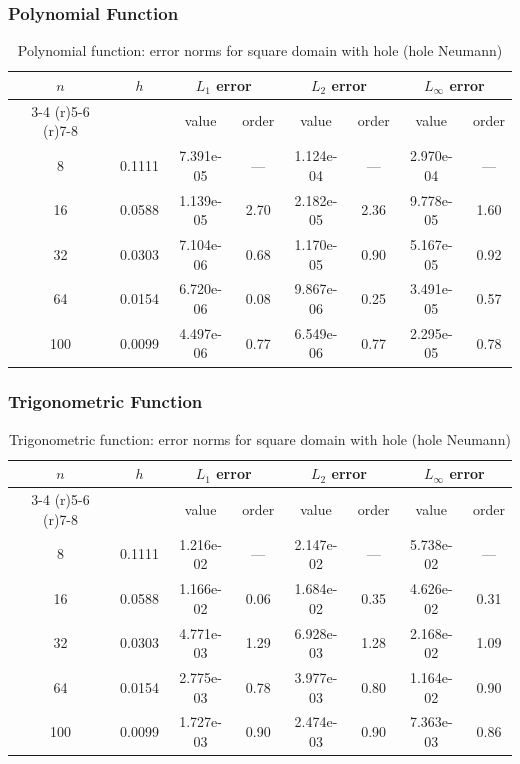 \documentclass[12pt,a4paper]{article}
\begin{document}
\subsubsection{Polynomial Function}
\begin{table}[H]
\centering
\caption{Polynomial function: error norms for square domain with hole (hole Neumann)}
\begin{tabular}{cccccccc}
\toprule
$n$ & $h$ & \multicolumn{2}{c}{$L_1$ error} & \multicolumn{2}{c}{$L_2$ error} & \multicolumn{2}{c}{$L_\infty$ error} \\
\cmidrule(r){3-4} \cmidrule(r){5-6} \cmidrule(r){7-8}
& & value & order & value & order & value & order \\
\midrule
8  & 0.1111 & 7.391e-05 & --- & 1.124e-04 & --- & 2.970e-04 & --- \\
16 & 0.0588 & 1.139e-05 & 2.70 & 2.182e-05 & 2.36 & 9.778e-05 & 1.60 \\
32 & 0.0303 & 7.104e-06 & 0.68 & 1.170e-05 & 0.90 & 5.167e-05 & 0.92 \\
64 & 0.0154 & 6.720e-06 & 0.08 & 9.867e-06 & 0.25 & 3.491e-05 & 0.57 \\
100 & 0.0099 & 4.497e-06 & 0.77 & 6.549e-06 & 0.77 & 2.295e-05 & 0.78 \\
\bottomrule
\end{tabular}
\end{table}

\subsubsection{Trigonometric Function}
\begin{table}[H]
\centering
\caption{Trigonometric function: error norms for square domain with hole (hole Neumann)}
\begin{tabular}{cccccccc}
\toprule
$n$ & $h$ & \multicolumn{2}{c}{$L_1$ error} & \multicolumn{2}{c}{$L_2$ error} & \multicolumn{2}{c}{$L_\infty$ error} \\
\cmidrule(r){3-4} \cmidrule(r){5-6} \cmidrule(r){7-8}
& & value & order & value & order & value & order \\
\midrule
8  & 0.1111 & 1.216e-02 & --- & 2.147e-02 & --- & 5.738e-02 & --- \\
16 & 0.0588 & 1.166e-02 & 0.06 & 1.684e-02 & 0.35 & 4.626e-02 & 0.31 \\
32 & 0.0303 & 4.771e-03 & 1.29 & 6.928e-03 & 1.28 & 2.168e-02 & 1.09 \\
64 & 0.0154 & 2.775e-03 & 0.78 & 3.977e-03 & 0.80 & 1.164e-02 & 0.90 \\
100 & 0.0099 & 1.727e-03 & 0.90 & 2.474e-03 & 0.90 & 7.363e-03 & 0.86 \\
\bottomrule
\end{tabular}
\end{table}
\end{document}
